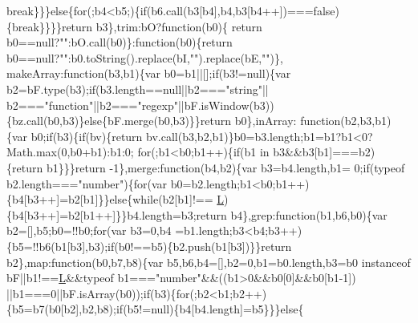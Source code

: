 \begin{DoxyCode}
{      break}\}\}\}\textcolor{keywordflow}{else}\{\textcolor{keywordflow}{for}(;b4<b5;)\{\textcolor{keywordflow}{if}(b6.call(b3[b4],b4,b3[b4++])===\textcolor{keyword}{false})\{\textcolor{keywordflow}{break}\}\}\}\}\textcolor{keywordflow}{return} b3\},trim:bO?\textcolor{keyword}{function}(b0)\{\textcolor{keywordflow}{
      return} b0==null?\textcolor{stringliteral}{""}:bO.call(b0)\}:\textcolor{keyword}{function}(b0)\{\textcolor{keywordflow}{return} b0==null?\textcolor{stringliteral}{""}:b0.toString().replace(bI,\textcolor{stringliteral}{""}).replace(bE,\textcolor{stringliteral}{""})\},
      makeArray:\textcolor{keyword}{function}(b3,b1)\{var b0=b1||[];\textcolor{keywordflow}{if}(b3!=null)\{var b2=bF.type(b3);\textcolor{keywordflow}{if}(b3.length==null||b2===\textcolor{stringliteral}{"string"}||
      b2===\textcolor{stringliteral}{"function"}||b2===\textcolor{stringliteral}{"regexp"}||bF.isWindow(b3))\{bz.call(b0,b3)\}\textcolor{keywordflow}{else}\{bF.merge(b0,b3)\}\}\textcolor{keywordflow}{return} b0\},inArray:\textcolor{keyword}{
      function}(b2,b3,b1)\{var b0;\textcolor{keywordflow}{if}(b3)\{\textcolor{keywordflow}{if}(bv)\{\textcolor{keywordflow}{return} bv.call(b3,b2,b1)\}b0=b3.length;b1=b1?b1<0?Math.max(0,b0+b1):b1:0;\textcolor{keywordflow}{
      for}(;b1<b0;b1++)\{\textcolor{keywordflow}{if}(b1 in b3&&b3[b1]===b2)\{\textcolor{keywordflow}{return} b1\}\}\}\textcolor{keywordflow}{return} -1\},merge:\textcolor{keyword}{function}(b4,b2)\{var b3=b4.length,b1=
      0;\textcolor{keywordflow}{if}(typeof b2.length===\textcolor{stringliteral}{"number"})\{\textcolor{keywordflow}{for}(var b0=b2.length;b1<b0;b1++)\{b4[b3++]=b2[b1]\}\}\textcolor{keywordflow}{else}\{\textcolor{keywordflow}{while}(b2[b1]!==
      \hyperlink{docs_2_programmer's_manual_2html_2jquery_8js_a38ee4c0b5f4fe2a18d0c783af540d253}{L})\{b4[b3++]=b2[b1++]\}\}b4.length=b3;\textcolor{keywordflow}{return} b4\},grep:\textcolor{keyword}{function}(b1,b6,b0)\{var b2=[],b5;b0=!!b0;\textcolor{keywordflow}{for}(var b3=0,b4
      =b1.length;b3<b4;b3++)\{b5=!!b6(b1[b3],b3);\textcolor{keywordflow}{if}(b0!==b5)\{b2.push(b1[b3])\}\}\textcolor{keywordflow}{return} b2\},map:\textcolor{keyword}{function}(b0,b7,b8)\{var
       b5,b6,b4=[],b2=0,b1=b0.length,b3=b0 instanceof bF||b1!==\hyperlink{docs_2_programmer's_manual_2html_2jquery_8js_a38ee4c0b5f4fe2a18d0c783af540d253}{L}&&typeof b1===\textcolor{stringliteral}{"number"}&&((b1>0&&b0[0]&&b0[b1-1])
      ||b1===0||bF.isArray(b0));\textcolor{keywordflow}{if}(b3)\{\textcolor{keywordflow}{for}(;b2<b1;b2++)\{b5=b7(b0[b2],b2,b8);\textcolor{keywordflow}{if}(b5!=null)\{b4[b4.length]=b5\}\}\}\textcolor{keywordflow}{else}\{\textcolor{keywordflow}{
}
\end{DoxyCode}
